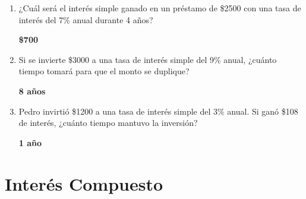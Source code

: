 \documentclass{article}
\begin{document}
\begin{enumerate}
    \item ¿Cuál será el interés simple ganado en un préstamo de \$2500 con una tasa de interés del 7\% anual durante 4 años?
    
    \textbf{\$700}
    
    \item Si se invierte \$3000 a una tasa de interés simple del 9\% anual, ¿cuánto tiempo tomará para que el monto se duplique?
    
    \textbf{8 años}
    
    \item Pedro invirtió \$1200 a una tasa de interés simple del 3\% anual. Si ganó \$108 de interés, ¿cuánto tiempo mantuvo la inversión?
    
    \textbf{1 año}
\end{enumerate}

\section{Interés Compuesto}
\end{document}
